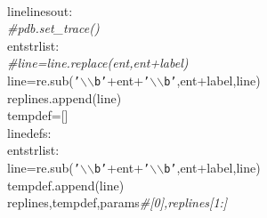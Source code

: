 {{\begin{tabbing}
\\
\hspace{5pt}line\hspace{5pt}linesout:
\\
{\it{\#\hspace{40pt}pdb.set\_trace()
}}\\
\hspace{5pt}ent\hspace{5pt}strlist:
\\
{\it{\#\hspace{60pt}line=line.replace(ent,ent+label)
}}\\
\hspace{60pt}line=re.sub({\texttt{{'}$\backslash$$\backslash$b{'}}}+ent+{\texttt{{'}$\backslash$$\backslash$b{'}}},ent+label,line)
\\
\hspace{40pt}replines.append(line)
\\
\hspace{20pt}tempdef={[}{]}
\\
\hspace{5pt}line\hspace{5pt}defs:
\\
\hspace{5pt}ent\hspace{5pt}strlist:
\\
\hspace{60pt}line=re.sub({\texttt{{'}$\backslash$$\backslash$b{'}}}+ent+{\texttt{{'}$\backslash$$\backslash$b{'}}},ent+label,line)
\\
\hspace{40pt}tempdef.append(line)
\\
\hspace{5pt}replines,\hspace{5pt}tempdef,\hspace{5pt}params{\it{\#{[}0{]},replines{[}1:{]}
}}\\


\end{tabbing}}}
